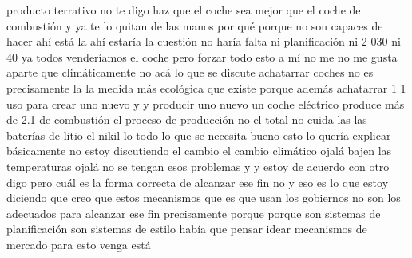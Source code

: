 producto terrativo no te digo haz que el coche sea mejor que el coche de combustión y ya te lo quitan de las manos por qué porque no son capaces de hacer ahí está la ahí estaría la cuestión no haría falta ni planificación ni 2 030 ni 40 ya todos venderíamos el coche pero forzar todo esto a mí no me no me gusta aparte que climáticamente no acá lo que se discute achatarrar coches no es precisamente la la medida más ecológica que existe porque además achatarrar 1 1 uso para crear uno nuevo y y producir uno nuevo un coche eléctrico produce más de 2.1 de combustión el proceso de producción no el total no cuida las las baterías de litio el nikil lo todo lo que se necesita bueno esto lo quería explicar básicamente no estoy discutiendo el cambio el cambio climático ojalá bajen las temperaturas ojalá no se tengan esos problemas y y estoy de acuerdo con otro digo pero cuál es la forma correcta de alcanzar ese fin no y eso es lo que estoy diciendo que creo que estos mecanismos que es que usan los gobiernos no son los adecuados para alcanzar ese fin precisamente porque porque son sistemas de planificación son sistemas de estilo había que pensar idear mecanismos de mercado para esto venga está
